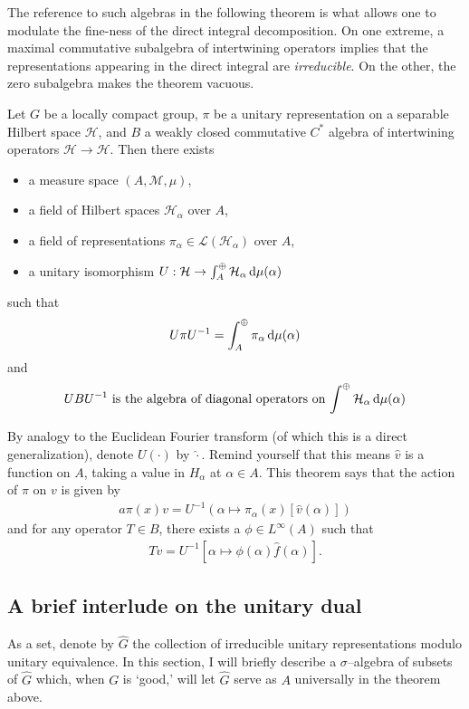 \documentclass[11pt]{amsart}
\newcommand{\M}{\mathcal{M}}
\renewcommand{\H}{\mathcal{H}}
\renewcommand{\L}{\mathcal{L}}
\begin{document}
\par The reference to such algebras in the following theorem is what allows one to modulate the fine-ness of the direct integral decomposition. On one extreme, a maximal commutative subalgebra of intertwining operators implies that the representations appearing in the direct integral are \emph{irreducible}. On the other, the zero subalgebra makes the theorem vacuous. 

\begin{thm}
	Let $G$ be a locally compact group, $\pi$ be a unitary representation on a separable Hilbert space $\H$, and $B$ a weakly closed commutative $C^{*}$ algebra of intertwining operators $\H \to \H$.  Then there exists 
		\begin{itemize}
			\item a measure space $(A,\M,\mu)$,
			\item a field of Hilbert spaces $\H_{\alpha}$ over $A$,
			\item a field of representations $\pi_{\alpha}\in \L(\H_{\alpha})$ over $A$, 
			\item a unitary isomorphism $U: \H \to \int^{\oplus}_{A}\H_{\alpha}\dop \mu(\alpha)$
		\end{itemize}
	such that
		\begin{align*}
			U\pi U^{-1}= \int^{\oplus}_{A}\pi_{\alpha}\,{\rm d} \mu(\alpha)
		\end{align*}
	and 
		\begin{align*}
			U B U^{-1} \text{ is the algebra of diagonal operators on $\int^{\oplus}\H_{\alpha}\dop \mu(\alpha)$}
		\end{align*}
\end{thm}
By analogy to the Euclidean Fourier transform (of which this is a direct generalization), denote $U(\cdot)$ by $\hat{\cdot}$. Remind yourself that this means $\hat{v}$ is a function on $A$, taking a value in $H_{\alpha}$ at $\alpha\in A$.  This theorem says that the action of $\pi$ on $v$ is given by 
	\begin{align*}a
		\pi(x) v= U^{-1} \left (\alpha\mapsto \pi_{\alpha}(x) [\hat{v}(\alpha)]\right)
	\end{align*}
and for any operator $T\in B$, there exists a $\phi \in L^{\infty}(A)$ such that 
	\begin{align*}
		Tv=U^{-1} \left[\alpha \mapsto \phi(\alpha) \hat{f}(\alpha)\right].
	\end{align*}


\subsection{A brief interlude on the unitary dual}
	As a set, denote by $\hat{G}$ the collection of irreducible unitary representations modulo unitary equivalence. In this section, I will briefly describe a $\sigma$--algebra of subsets of $\hat{G}$ which, when $G$ is `good,' will let $\hat{G}$ serve as $A$ universally in the theorem above. 
	
\end{document}
